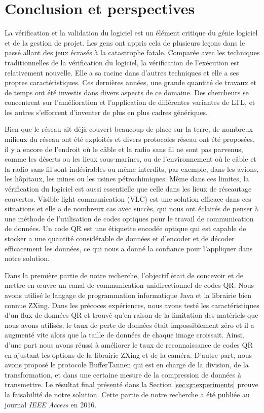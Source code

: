 
\chapter{Conclusion et perspectives}

La vérification et la validation du logiciel est un élément critique du génie logiciel et de la gestion de projet. Les gens ont appris cela de plusieurs leçons dans le passé allant des jeux écrasés à la catastrophe fatale. Comparée avec les techniques traditionnelles de la vérification du logiciel, la vérification de l'exécution est relativement nouvelle. Elle a sa racine dans d'autres techniques et elle a ses propres caractéristiques. Ces dernières années, une grande quantité de travaux et de temps ont été investis dans divers aspects de ce domaine. Des chercheurs se concentrent sur l'amélioration et l'application de différentes variantes de LTL, et les autres s'efforcent d'inventer de plus en plus cadres génériques.

Bien que le réseau ait déjà couvert beaucoup de place sur la terre, de nombreux milieux du réseau ont été exploités et divers protocoles réseau ont été proposées, il y a encore de l'endroit où le câble et la radio sans fil ne sont pas parvenus, comme les déserts ou les lieux sous-marines, ou de l'environnement où le câble et la radio sans fil sont indésirables ou même interdits, par exemple, dans les avions, les hôpitaux, les mines ou les usines pétrochimiques. Même dans ces limites, la vérification du logiciel est aussi essentielle que celle dans les lieux de réseautage couvertes. Visible light communication (VLC) est une solution efficace dans ces situations et elle a de nombreux cas avec succès, qui nous ont éclairés de penser à une méthode de l'utilisation de codes optiques pour le travail de communication de données. Un code QR est une étiquette encodée optique qui est capable de stocker a une quantité considérable de données et d'encoder et de décoder efficacement les données, ce qui nous a donné la confiance pour l'appliquer dans notre solution.

Dans la première partie de notre recherche, l'objectif était de concevoir et de mettre en \oe{}uvre un canal de communication unidirectionnel de codes QR. Nous avons utilisé le langage de programmation informatique Java et la librairie bien connue ZXing. Dans les précoces expériences, nous avons testé les caractéristiques d'un flux de données QR et trouvé qu'en raison de la limitation des matériels que nous avons utilisés, le taux de perte de données était impossiblement zéro et il a augmenté vite alors que la taille de données de chaque image croissait. Ainsi, d'une part nous avons réussi à améliorer le taux de reconnaissance de codes QR en ajustant les options de la librairie ZXing et de la caméra. D'autre part, nous avons proposé le protocole BufferTannen qui est en charge de la division, de la transformation, et dans une certaine mesure de la compression de données à transmettre. Le résultat final présenté dans la Section \ref{sec:qr:experiments} prouve la faisabilité de notre solution. Cette partie de notre recherche a été publiée au journal \textit{IEEE Access} en 2016.

